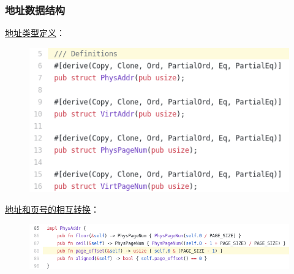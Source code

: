 \begin{frame}
    \frametitle{地址数据结构}
\href{https://github.com/rcore-os/rCore-Tutorial-v3/blob/ch4/os/src/mm/address.rs\#L5}{地址类型定义}：%
    \begin{figure}
        \centering
        \includegraphics[width=0.4\linewidth]{figs/address-5.png}
    \end{figure}
% 
% 
\href{https://github.com/rcore-os/rCore-Tutorial-v3/blob/ch4/os/src/mm/address.rs\#L88}{地址和页号的相互转换}：
    \begin{figure}
        \centering
        \includegraphics[width=0.7\linewidth]{figs/address-88.png}
    \end{figure}
% 
% 
\end{frame}
